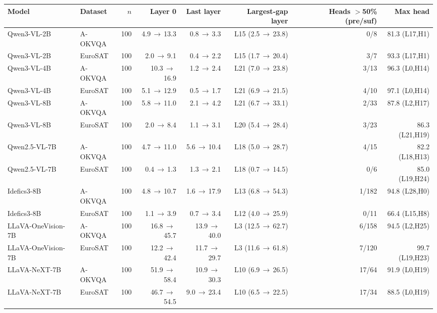 \begin{tabular}{llrrrrrr}
\toprule
Model & Dataset & $n$ & Layer 0 & Last layer & Largest-gap layer & Heads $>$50\% (pre/suf) & Max head \\
\midrule
Qwen3-VL-2B & A-OKVQA & 100 & 4.9\,$\to$\,13.3 & 0.8\,$\to$\,3.3 & L15 (2.5\,$\to$\,23.8) & 0/8 & 81.3 (L17,H1) \\
Qwen3-VL-2B & EuroSAT & 100 & 2.0\,$\to$\,9.1 & 0.4\,$\to$\,2.2 & L15 (1.7\,$\to$\,20.4) & 3/7 & 93.3 (L17,H1) \\
Qwen3-VL-4B & A-OKVQA & 100 & 10.3\,$\to$\,16.9 & 1.2\,$\to$\,2.4 & L21 (7.0\,$\to$\,23.8) & 3/13 & 96.3 (L0,H14) \\
Qwen3-VL-4B & EuroSAT & 100 & 5.1\,$\to$\,12.9 & 0.5\,$\to$\,1.7 & L21 (6.9\,$\to$\,21.5) & 4/10 & 97.1 (L0,H14) \\
Qwen3-VL-8B & A-OKVQA & 100 & 5.8\,$\to$\,11.0 & 2.1\,$\to$\,4.2 & L21 (6.7\,$\to$\,33.1) & 2/33 & 87.8 (L2,H17) \\
Qwen3-VL-8B & EuroSAT & 100 & 2.0\,$\to$\,8.4 & 1.1\,$\to$\,3.1 & L20 (5.4\,$\to$\,28.4) & 3/23 & 86.3 (L21,H19) \\
Qwen2.5-VL-7B & A-OKVQA & 100 & 4.7\,$\to$\,11.0 & 5.6\,$\to$\,10.4 & L18 (5.0\,$\to$\,28.7) & 4/15 & 82.2 (L18,H13) \\
Qwen2.5-VL-7B & EuroSAT & 100 & 0.4\,$\to$\,1.3 & 1.3\,$\to$\,2.1 & L18 (0.7\,$\to$\,14.5) & 0/6 & 85.0 (L19,H24) \\
Idefics3-8B & A-OKVQA & 100 & 4.8\,$\to$\,10.7 & 1.6\,$\to$\,17.9 & L13 (6.8\,$\to$\,54.3) & 1/182 & 94.8 (L28,H0) \\
Idefics3-8B & EuroSAT & 100 & 1.1\,$\to$\,3.9 & 0.7\,$\to$\,3.4 & L12 (4.0\,$\to$\,25.9) & 0/11 & 66.4 (L15,H8) \\
LLaVA-OneVision-7B & A-OKVQA & 100 & 16.8\,$\to$\,45.7 & 13.9\,$\to$\,40.0 & L3 (12.5\,$\to$\,62.7) & 6/158 & 94.5 (L2,H25) \\
LLaVA-OneVision-7B & EuroSAT & 100 & 12.2\,$\to$\,42.4 & 11.7\,$\to$\,29.7 & L3 (11.6\,$\to$\,61.8) & 7/120 & 99.7 (L19,H23) \\
LLaVA-NeXT-7B & A-OKVQA & 100 & 51.9\,$\to$\,58.4 & 10.9\,$\to$\,30.3 & L10 (6.9\,$\to$\,26.5) & 17/64 & 91.9 (L0,H19) \\
LLaVA-NeXT-7B & EuroSAT & 100 & 46.7\,$\to$\,54.5 & 9.0\,$\to$\,23.4 & L10 (6.5\,$\to$\,22.5) & 17/34 & 88.5 (L0,H19) \\
\bottomrule
\end{tabular}
